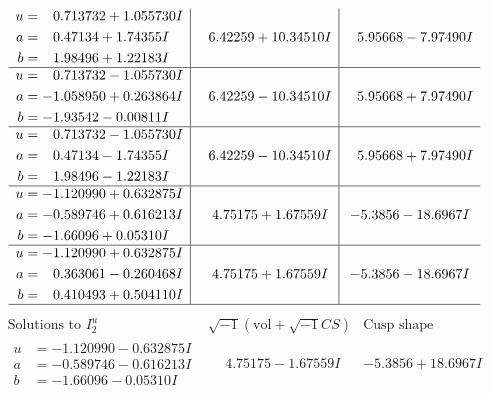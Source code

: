\documentclass[1p]{elsarticle_modified}
\theoremstyle{definition}
\newcommand{\I}{\sqrt{-1}}
\begin{document}
$$\begin{array}{c|c|c}
\begin{aligned}
u &= \phantom{-}0.713732 + 1.055730 I \\
a &= \phantom{-}0.47134 + 1.74355 I \\
b &= \phantom{-}1.98496 + 1.22183 I\end{aligned}
 & \phantom{-}6.42259 + 10.34510 I & \phantom{-}5.95668 - 7.97490 I \\ \hline\begin{aligned}
u &= \phantom{-}0.713732 - 1.055730 I \\
a &= -1.058950 + 0.263864 I \\
b &= -1.93542 - 0.00811 I\end{aligned}
 & \phantom{-}6.42259 - 10.34510 I & \phantom{-}5.95668 + 7.97490 I \\ \hline\begin{aligned}
u &= \phantom{-}0.713732 - 1.055730 I \\
a &= \phantom{-}0.47134 - 1.74355 I \\
b &= \phantom{-}1.98496 - 1.22183 I\end{aligned}
 & \phantom{-}6.42259 - 10.34510 I & \phantom{-}5.95668 + 7.97490 I \\ \hline\begin{aligned}
u &= -1.120990 + 0.632875 I \\
a &= -0.589746 + 0.616213 I \\
b &= -1.66096 + 0.05310 I\end{aligned}
 & \phantom{-}4.75175 + 1.67559 I & -5.3856 - 18.6967 I \\ \hline\begin{aligned}
u &= -1.120990 + 0.632875 I \\
a &= \phantom{-}0.363061 - 0.260468 I \\
b &= \phantom{-}0.410493 + 0.504110 I\end{aligned}
 & \phantom{-}4.75175 + 1.67559 I & -5.3856 - 18.6967 I\\
 \hline 
 \end{array}$$\newpage$$\begin{array}{c|c|c}  
\text{Solutions to }I^u_{2}& \I (\text{vol} + \sqrt{-1}CS) & \text{Cusp shape}\\
 \hline 
\begin{aligned}
u &= -1.120990 - 0.632875 I \\
a &= -0.589746 - 0.616213 I \\
b &= -1.66096 - 0.05310 I\end{aligned}
 & \phantom{-}4.75175 - 1.67559 I & -5.3856 + 18.6967 I \\ \hline\begin{aligned}

\end{aligned}
\end{array}$$
\end{document}
